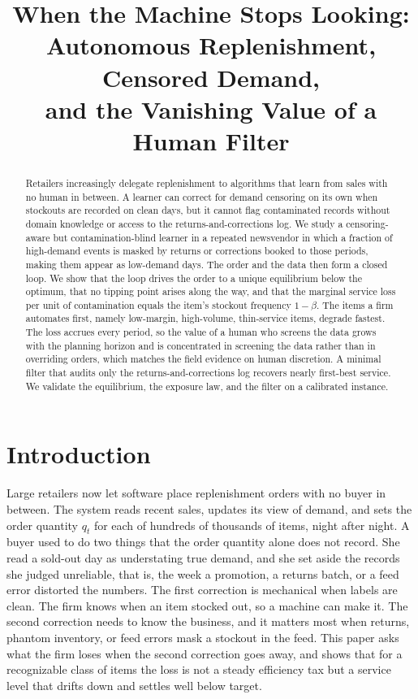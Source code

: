 \documentclass[11pt]{article}
\title{\vspace{-2.5em}\textbf{When the Machine Stops Looking:\\
Autonomous Replenishment, Censored Demand,\\
and the Vanishing Value of a Human Filter}}
\author{}
\date{}
\theoremstyle{plain}
\begin{document}
\maketitle
\vspace{-3em}

\begin{abstract}
\noindent
Retailers increasingly delegate replenishment to algorithms that learn from
sales with no human in between. A learner can correct for demand censoring on its
own when stockouts are recorded on clean days, but it cannot flag contaminated
records without domain knowledge or access to the returns-and-corrections log.
We study a censoring-aware but contamination-blind learner in a repeated
newsvendor in which a fraction of high-demand events is masked by returns or
corrections booked to those periods, making them appear as low-demand days.
The order and the data then form a closed
loop. We show that the loop drives the order to a unique equilibrium below the
optimum, that no tipping point arises along the way, and that the marginal service
loss per unit of contamination equals the item's stockout frequency $1-\beta$. The
items a firm automates first, namely low-margin, high-volume, thin-service items,
degrade fastest. The loss accrues every period, so the value of a human who
screens the data grows with the planning horizon and is concentrated in screening
the data rather than in overriding orders, which matches the field evidence on
human discretion. A minimal filter that audits only the returns-and-corrections log
recovers nearly first-best service. We validate the equilibrium, the exposure law,
and the filter on a calibrated instance.
\end{abstract}

\section{Introduction}

Large retailers now let software place replenishment orders with no buyer in
between. The system reads recent sales, updates its view of demand, and sets the
order quantity $q_t$ for each of hundreds of thousands of items, night after
night. A buyer used to do two things that the order quantity alone does not
record. She read a sold-out day as understating true demand, and she set aside the
records she judged unreliable, that is, the week a promotion, a returns batch, or
a feed error distorted the numbers. The first correction is mechanical when
labels are clean. The firm knows when an item stocked out, so a machine can make
it. The second correction needs to know the business, and it matters most when
returns, phantom inventory, or feed errors mask a stockout in the feed. This paper
asks what the firm loses when the second correction goes away, and shows that for
a recognizable class of items the loss is not a steady efficiency tax but a
service level that drifts down and settles well below target.
\end{document}
